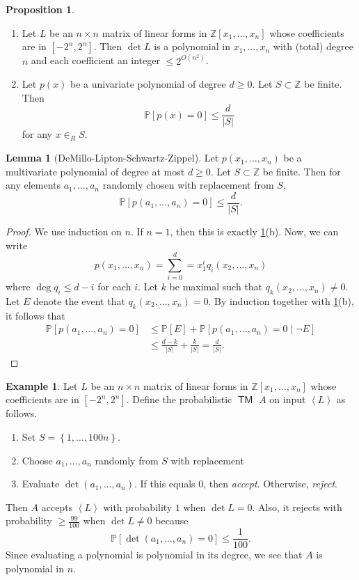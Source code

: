 \documentclass[10pt,letterpaper,cm]{nupset}
\theoremstyle{definition}
\newtheorem{exmp}[definition]{Example}
\theoremstyle{theorem}
\newtheorem{lemma}[definition]{Lemma}
\newtheorem{prop}[definition]{Proposition}
\theoremstyle{remark}
\newcommand{\Z}{\mathbb Z}
\newcommand{\1}{\mathbf{1}}
\newcommand{\0}{\vec 0}
\DeclareMathOperator{\TM}{\mathsf{TM}}
\begin{document}
\begin{prop}\label{poly} $ $
\begin{enumerate}[label=(\alph*)]
\item Let $L$ be an $n\times n$ matrix of linear forms in $\Z[x_1, \ldots, x_n]$ whose coefficients are in $\left[{-2}^n, 2^n\right]$. Then $\det{L}$ is a polynomial in $x_1, \ldots, x_n$ with (total) degree $n$ and each coefficient an integer $\leq 2^{O\left(n^2\right)}$.
\item Let $p(x)$ be a univariate polynomial of degree $d \geq 0$. Let $S\subset \Z$ be finite. Then $$\mathbb{P}\left[p(x) =0\right] \leq \frac{d}{\left\lvert{S}\right\rvert}$$ for any $x\in_R S$.
\end{enumerate}
\end{prop}

\begin{lemma}[DeMillo-Lipton-Schwartz-Zippel]\label{Dem}
Let $p(x_1, \ldots, x_n)$ be a multivariate polynomial of degree at most $d\geq 0$. Let $S \subset \Z$ be finite. Then for any elements $a_1, \ldots, a_n$ randomly chosen with replacement from $S$, $$\mathbb{P}\left[p(a_1, \ldots, a_n) =0\right] \leq \frac{d}{\left\lvert{S}\right\rvert}.$$
\end{lemma}
\begin{proof}
We use induction on $n$. If $n=1$, then this is exactly \cref{poly}(b). Now, we can write $$p(x_1, \ldots, x_n) = \sum_{i=0}^d = x_1^i q_i(x_2, \ldots, x_n)$$ where $\deg{q_i} \leq d-i$ for each $i$. Let $k$ be maximal such that $q_k(x_2, \ldots, x_n) \ne 0$. Let $E$ denote the event that $q_k(x_2, \ldots, x_n) =0$. 
By induction together with \cref{poly}(b), it follows that  
\begin{align*} \mathbb{P}\left[p(a_1, \ldots, a_n) =0\right] & \leq \mathbb{P}[E] + \mathbb{P}\left[p(a_1, \ldots, a_n) =0 \mid \neg{E}\right]
\\ & \leq \frac{d-k}{\left\lvert{S}\right\rvert} + \frac{k}{\left\lvert{S}\right\rvert} = \frac{d}{\left\lvert{S}\right\rvert}.
\end{align*}
\end{proof}

\begin{exmp}\label{matrix}
Let $L$ be an $n \times n$ matrix of linear forms in $\Z[x_1, \ldots, x_n]$ whose coefficients are in $\left[{-2}^n, 2^n\right]$. Define the probabilistic $\TM$ $A$ on input $\left\langle L \right\rangle$ as follows. 
\begin{enumerate}
\item Set $S = \left\{1, \ldots, 100n\right\}$.
\item Choose $a_1, \ldots, a_n$ randomly from $S$ with replacement
\item Evaluate $\det(a_1, \ldots, a_n)$.  If this equals $0$, then \textit{accept}. Otherwise, \textit{reject}.
\end{enumerate}
Then $A$ accepts $\left\langle L \right\rangle$ with probability $1$ when $\det{L} = 0$. Also, it rejects with probability $\geq \frac{99}{100}$ when $\det{L} \ne 0$ because $$\mathbb{P}\left[\det(a_1, \ldots, a_n) =0\right] \leq \frac{1}{100}.$$ Since evaluating a polynomial is polynomial in its degree, we see that $A$ is polynomial in $n$.
\end{exmp}
\end{document}
